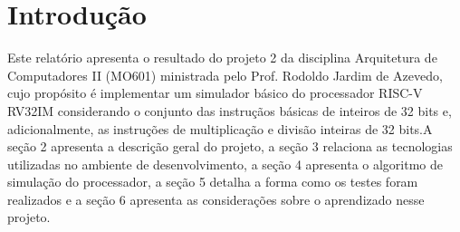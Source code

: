 \section{Introdução}

Este relatório apresenta  o resultado do projeto 2 da disciplina Arquitetura de Computadores II (MO601) \space ministrada pelo Prof. Rodoldo Jardim de Azevedo, cujo propósito é implementar um simulador básico do processador RISC-V RV32IM considerando o conjunto das instruçãos básicas de inteiros de 32 bits e, adicionalmente, as instruções de multiplicação e divisão inteiras de 32 bits.A seção 2 apresenta a descrição geral do projeto, a seção 3 relaciona as tecnologias utilizadas no ambiente de desenvolvimento, a seção 4 apresenta o algoritmo de simulação do processador, a seção 5 detalha a forma como os testes foram realizados e a seção 6 apresenta as considerações sobre o aprendizado nesse projeto.